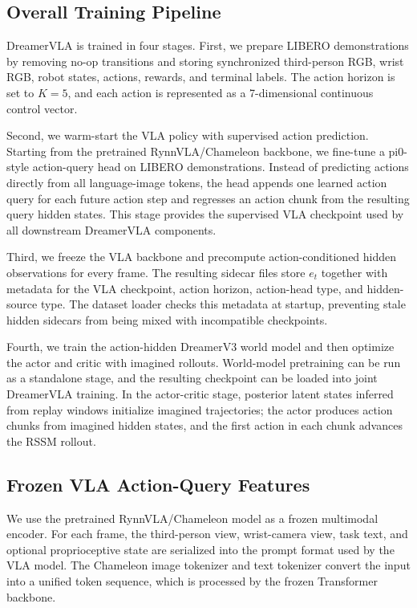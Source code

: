 \subsection{Overall Training Pipeline}

DreamerVLA is trained in four stages. First, we prepare LIBERO demonstrations by removing no-op transitions and storing synchronized third-person RGB, wrist RGB, robot states, actions, rewards, and terminal labels. The action horizon is set to $K=5$, and each action is represented as a 7-dimensional continuous control vector.

Second, we warm-start the VLA policy with supervised action prediction. Starting from the pretrained RynnVLA/Chameleon backbone, we fine-tune a pi0-style action-query head on LIBERO demonstrations. Instead of predicting actions directly from all language-image tokens, the head appends one learned action query for each future action step and regresses an action chunk from the resulting query hidden states. This stage provides the supervised VLA checkpoint used by all downstream DreamerVLA components.

Third, we freeze the VLA backbone and precompute action-conditioned hidden observations for every frame. The resulting sidecar files store $e_t$ together with metadata for the VLA checkpoint, action horizon, action-head type, and hidden-source type. The dataset loader checks this metadata at startup, preventing stale hidden sidecars from being mixed with incompatible checkpoints.

Fourth, we train the action-hidden DreamerV3 world model and then optimize the actor and critic with imagined rollouts. World-model pretraining can be run as a standalone stage, and the resulting checkpoint can be loaded into joint DreamerVLA training. In the actor-critic stage, posterior latent states inferred from replay windows initialize imagined trajectories; the actor produces action chunks from imagined hidden states, and the first action in each chunk advances the RSSM rollout.

\subsection{Frozen VLA Action-Query Features}

We use the pretrained RynnVLA/Chameleon model as a frozen multimodal encoder. For each frame, the third-person view, wrist-camera view, task text, and optional proprioceptive state are serialized into the prompt format used by the VLA model. The Chameleon image tokenizer and text tokenizer convert the input into a unified token sequence, which is processed by the frozen Transformer backbone.

